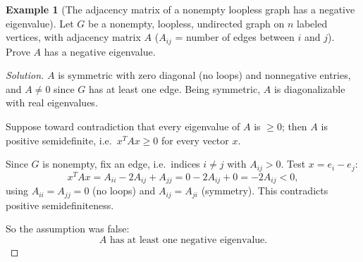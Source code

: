 \documentclass[11pt]{article}
\theoremstyle{definition}
\newtheorem{example}{Example}[section]
\begin{document}
\begin{example}[The adjacency matrix of a nonempty loopless graph has a negative eigenvalue]
Let $G$ be a nonempty, loopless, undirected graph on $n$ labeled vertices, with adjacency matrix $A$ ($A_{ij}$ = number of edges between $i$ and $j$). Prove $A$ has a negative eigenvalue.
\end{example}
\begin{proof}[Solution]
$A$ is symmetric with zero diagonal (no loops) and nonnegative entries, and $A\ne0$ since $G$ has at least one edge. Being symmetric, $A$ is diagonalizable with real eigenvalues.

Suppose toward contradiction that every eigenvalue of $A$ is $\ge0$; then $A$ is positive semidefinite, i.e.\ $x^TAx\ge0$ for every vector $x$.

Since $G$ is nonempty, fix an edge, i.e.\ indices $i\ne j$ with $A_{ij}>0$. Test $x=e_i-e_j$:
\[
x^TAx=A_{ii}-2A_{ij}+A_{jj}=0-2A_{ij}+0=-2A_{ij}<0,
\]
using $A_{ii}=A_{jj}=0$ (no loops) and $A_{ij}=A_{ji}$ (symmetry). This contradicts positive semidefiniteness.

So the assumption was false:
\[
\boxed{A\text{ has at least one negative eigenvalue}}.
\]
\end{proof}
\end{document}
